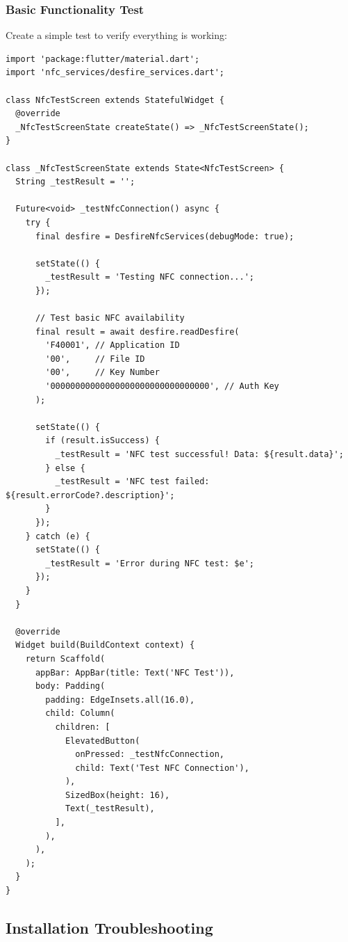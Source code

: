 \documentclass[a4paper,12pt]{article}
\begin{document}
\subsubsection{Basic Functionality Test}
Create a simple test to verify everything is working:

\begin{lstlisting}
import 'package:flutter/material.dart';
import 'nfc_services/desfire_services.dart';

class NfcTestScreen extends StatefulWidget {
  @override
  _NfcTestScreenState createState() => _NfcTestScreenState();
}

class _NfcTestScreenState extends State<NfcTestScreen> {
  String _testResult = '';

  Future<void> _testNfcConnection() async {
    try {
      final desfire = DesfireNfcServices(debugMode: true);
      
      setState(() {
        _testResult = 'Testing NFC connection...';
      });
      
      // Test basic NFC availability
      final result = await desfire.readDesfire(
        'F40001', // Application ID
        '00',     // File ID
        '00',     // Key Number
        '00000000000000000000000000000000', // Auth Key
      );
      
      setState(() {
        if (result.isSuccess) {
          _testResult = 'NFC test successful! Data: ${result.data}';
        } else {
          _testResult = 'NFC test failed: ${result.errorCode?.description}';
        }
      });
    } catch (e) {
      setState(() {
        _testResult = 'Error during NFC test: $e';
      });
    }
  }

  @override
  Widget build(BuildContext context) {
    return Scaffold(
      appBar: AppBar(title: Text('NFC Test')),
      body: Padding(
        padding: EdgeInsets.all(16.0),
        child: Column(
          children: [
            ElevatedButton(
              onPressed: _testNfcConnection,
              child: Text('Test NFC Connection'),
            ),
            SizedBox(height: 16),
            Text(_testResult),
          ],
        ),
      ),
    );
  }
}
\end{lstlisting}

\subsection{Installation Troubleshooting}
\end{document}

